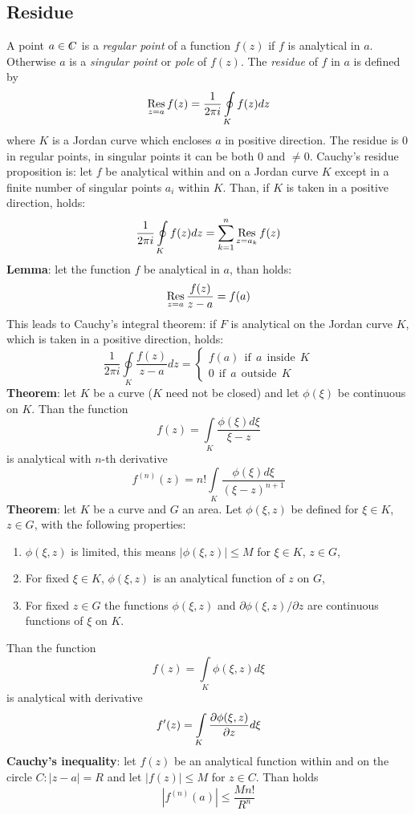 \documentclass[twoside]{report}
\begin{document}
\subsection{Residue}
A point $a\in\CC$ is a {\it regular point} of a function $f(z)$ if $f$ is
analytical in $a$. Otherwise $a$ is a {\it singular point} or {\it pole} of
$f(z)$. The {\it residue} of $f$ in $a$ is defined by
\[
\mathop{\rm Res}\limits_{z=a}f(z)=\frac{1}{2\pi i}\oint\limits_Kf(z)dz
\]
where $K$ is a Jordan curve which encloses $a$ in positive direction. The
residue is 0 in regular points, in singular points it can be both 0 and $\neq0$.
Cauchy's residue proposition is: let $f$ be analytical within and on a Jordan
curve $K$ except in a finite number of singular points $a_i$ within $K$. Than,
if $K$ is taken in a positive direction, holds:
\[
\frac{1}{2\pi i}\oint\limits_Kf(z)dz=\sum_{k=1}^n\mathop{\rm Res}\limits_{z=a_k}f(z)
\]
{\bf Lemma}: let the function $f$ be analytical in $a$, than holds:
\[
\mathop{\rm Res}\limits_{z=a}\frac{f(z)}{z-a}=f(a)
\]
This leads to Cauchy's integral theorem: if $F$ is analytical on the Jordan
curve $K$, which is taken in a positive direction, holds:
\[
\frac{1}{2\pi i}\oint\limits_K\frac{f(z)}{z-a}dz=\left\{\begin{array}{l}
f(a)~~\mbox{if}~~a~~\mbox{inside}~~K\\
0~~\mbox{if}~~a~~\mbox{outside}~~K
\end{array}\right.
\]
{\bf Theorem}: let $K$ be a curve ($K$ need not be closed) and let
$\phi(\xi)$ be continuous on $K$. Than the function
\[
f(z)=\int\limits_K\frac{\phi(\xi)d\xi}{\xi-z}
\]
is analytical with $n$-th derivative
\[
f^{(n)}(z)=n!\int\limits_K\frac{\phi(\xi)d\xi}{(\xi-z)^{n+1}}
\]
{\bf Theorem}: let $K$ be a curve and $G$ an area. Let $\phi(\xi,z)$ be
defined for $\xi\in K$, $z\in G$, with the following properties:
\begin{enumerate}
\item $\phi(\xi,z)$ is limited, this means $|\phi(\xi,z)|\leq M$ for $\xi\in K$, $z\in G$,
\item For fixed $\xi\in K$, $\phi(\xi,z)$ is an analytical function of $z$ on $G$,
\item For fixed $z\in G$ the functions $\phi(\xi,z)$ and $\partial\phi(\xi,z)/\partial z$
      are continuous functions of $\xi$ on $K$.
\end{enumerate}
Than the function
\[
f(z)=\int\limits_K\phi(\xi,z)d\xi
\]
is analytical with derivative
\[
f'(z)=\int\limits_K\frac{\partial \phi(\xi,z)}{\partial z}d\xi
\]
{\bf Cauchy's inequality}: let $f(z)$ be an analytical function within and on
the circle $C:|z-a|=R$ and let $|f(z)|\leq M$ for $z\in C$. Than holds
\[
\left|f^{(n)}(a)\right|\leq\frac{Mn!}{R^n}
\]
\end{document}
